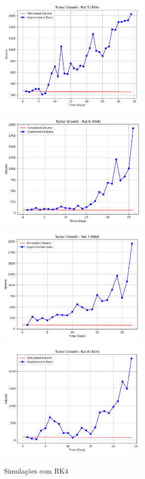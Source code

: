 \documentclass[12pt]{article}
\begin{document}
\begin{figure}[H]
    \centering
    \includegraphics[width=7.3cm,height=6cm]{pic/e.png}
    \includegraphics[width=7.3cm,height=6cm]{pic/f.png}
    \includegraphics[width=7.3cm,height=6cm]{pic/g.png}
    \includegraphics[width=7.3cm,height=6cm]{pic/h.png}
    \caption{Simulações com RK4}
    \label{fig:map6}
\end{figure}
\end{document}
